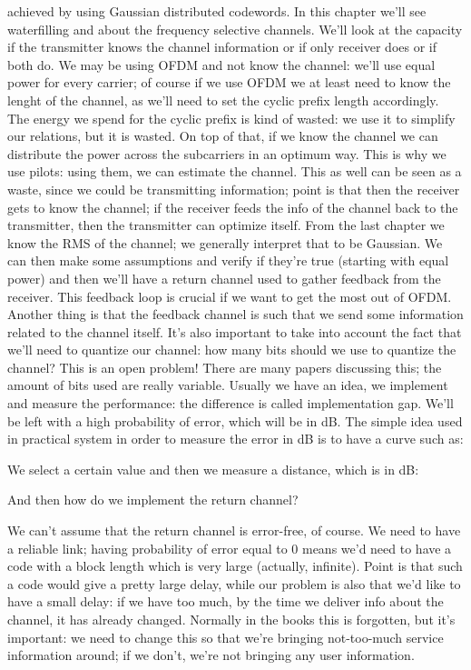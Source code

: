 {{{{{achieved by using Gaussian distributed codewords.
In this chapter we'll see waterfilling and about the frequency selective channels.
We'll look at the capacity if the transmitter knows the channel information or if only receiver does or if both do.
We may be using OFDM and not know the channel: we'll use equal power for every carrier; of course if we use OFDM we at least need to know the lenght of the channel,
as we'll need to set the cyclic prefix length accordingly. The energy we spend for the cyclic prefix is kind of wasted: we use it to simplify our relations, but it is wasted.
On top of that, if we know the channel we can distribute the power across the subcarriers in an optimum way. This is why we use pilots: using them, we can estimate the channel. This as well can be seen as a waste, since we could be transmitting information; point is that then the receiver gets to know the channel; if the receiver feeds the info of the channel back to the transmitter, then the transmitter can optimize itself.
From the last chapter we know the RMS of the channel; we generally interpret that to be Gaussian. We can then make some assumptions and verify if they're true (starting with equal power) and then we'll have a return channel used to gather feedback from the receiver.
This feedback loop is crucial if we want to get the most out of OFDM. Another thing is that the feedback channel is such that we send some information related to the channel itself.
It's also important to take into account the fact that we'll need to quantize our channel:
how many bits should we use to quantize the channel? This is an open problem!
There are many papers discussing this; the amount of bits used are really variable.
Usually we have an idea, we implement and measure the performance: the difference is called implementation gap. We'll be left with a high probability of error, which will be in dB.
The simple idea used in practical system in order to measure the error in dB is to have a curve such as:

We select a certain value and then we measure a distance, which is in dB:

And then how do we implement the return channel?

We can't assume that the return channel is error-free, of course.
We need to have a reliable link; having probability of error equal to 0 means we'd need to have a code with a block length which is very large (actually, infinite). Point is that such a code would give a pretty large delay, while our problem is also that we'd like to have a small delay: if we have too much, by the time we deliver info about the channel,
it has already changed.
Normally in the books this is forgotten, but it's important: we need to change this so that we're bringing not-too-much service information around; if we don't, we're not bringing any user information.

}}}}}
